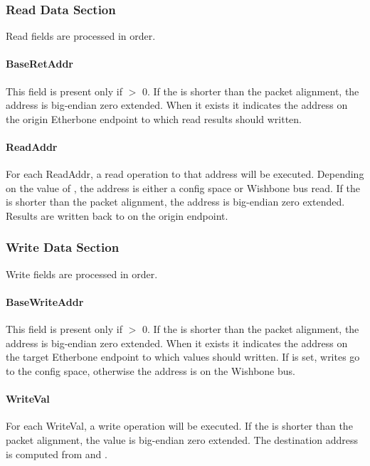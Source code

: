 \documentclass{article}
\begin{document}
\subsubsection{Read Data Section}

Read fields are processed in order.

\paragraph{BaseRetAddr} \label{field:BaseRetAddr}
This field is present only if  $>$ 0.
If the  is shorter than the packet alignment, 
the address is big-endian zero extended.
When it exists it indicates the address on the origin Etherbone endpoint 
to which read results should written.

\paragraph{ReadAddr} \label{field:ReadAddr}
For each ReadAddr, 
a read operation to that address will be executed.
Depending on the value of ,
the address is either a config space or Wishbone bus read.
If the  is shorter than the packet alignment, 
the address is big-endian zero extended.
Results are written back to  on the origin endpoint.

\subsubsection{Write Data Section}

Write fields are processed in order.

\paragraph{BaseWriteAddr} \label{field:BaseWriteAddr}
This field is present only if  $>$ 0.
If the  is shorter than the packet alignment, 
the address is big-endian zero extended.
When it exists it indicates the address on the target Etherbone endpoint 
to which values should written.
If  is set,
writes go to the config space,
otherwise the address is on the Wishbone bus.

\paragraph{WriteVal} \label{field:WriteVal}
For each WriteVal, 
a write operation will be executed.
If the  is shorter than the packet alignment, 
the value is big-endian zero extended.
The destination address is computed from  and 
.
\end{document}
